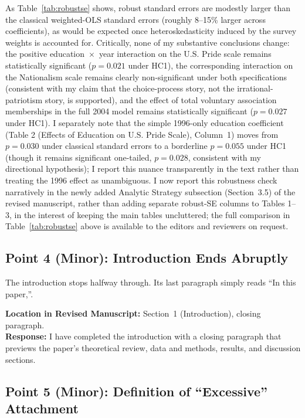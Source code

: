 \documentclass[11pt]{article}
\begin{document}
As Table~\ref{tab:robustse} shows, robust standard errors are modestly larger than the classical weighted-OLS standard errors (roughly 8--15\% larger across coefficients), as would be expected once heteroskedasticity induced by the survey weights is accounted for. Critically, none of my substantive conclusions change: the positive education~$\times$~year interaction on the U.S. Pride scale remains statistically significant ($p = 0.021$ under HC1), the corresponding interaction on the Nationalism scale remains clearly non-significant under both specifications (consistent with my claim that the choice-process story, not the irrational-patriotism story, is supported), and the effect of total voluntary association memberships in the full 2004 model remains statistically significant ($p = 0.027$ under HC1). I separately note that the simple 1996-only education coefficient (Table 2 (Effects of Education on U.S. Pride Scale), Column~1) moves from $p = 0.030$ under classical standard errors to a borderline $p = 0.055$ under HC1 (though it remains significant one-tailed, $p = 0.028$, consistent with my directional hypothesis); I report this nuance transparently in the text rather than treating the 1996 effect as unambiguous. I now report this robustness check narratively in the newly added Analytic Strategy subsection (Section~3.5) of the revised manuscript, rather than adding separate robust-SE columns to Tables 1--3, in the interest of keeping the main tables uncluttered; the full comparison in Table~\ref{tab:robustse} above is available to the editors and reviewers on request.

\subsection*{Point 4 (Minor): Introduction Ends Abruptly}

\begin{reviewercomment}
The introduction stops halfway through. Its last paragraph simply reads ``In this paper,''.
\end{reviewercomment}

\noindent\textbf{Location in Revised Manuscript:} Section~1 (Introduction), closing paragraph.\\[4pt]
\textbf{Response:} I have completed the introduction with a closing paragraph that previews the paper's theoretical review, data and methods, results, and discussion sections.

\subsection*{Point 5 (Minor): Definition of ``Excessive'' Attachment}
\end{document}
